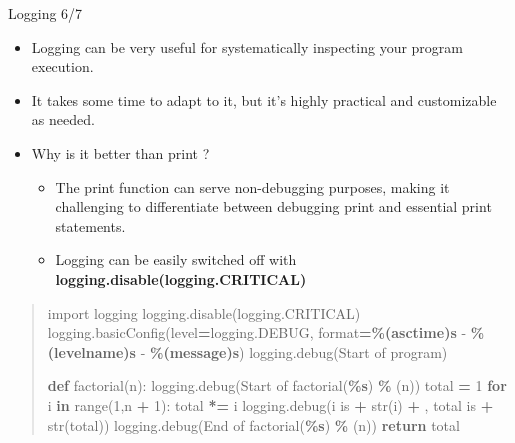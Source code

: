 \documentclass[
  8pt,
  ignorenonframetext,
]{beamer}
\newenvironment{Shaded}{\begin{snugshade}}{\end{snugshade}}
\newcommand{\BuiltInTok}[1]{#1}
\newcommand{\ControlFlowTok}[1]{\textcolor[rgb]{0.13,0.29,0.53}{\textbf{#1}}}
\newcommand{\DecValTok}[1]{\textcolor[rgb]{0.00,0.00,0.81}{#1}}
\newcommand{\ImportTok}[1]{#1}
\newcommand{\KeywordTok}[1]{\textcolor[rgb]{0.13,0.29,0.53}{\textbf{#1}}}
\newcommand{\NormalTok}[1]{#1}
\newcommand{\OperatorTok}[1]{\textcolor[rgb]{0.81,0.36,0.00}{\textbf{#1}}}
\newcommand{\SpecialCharTok}[1]{\textcolor[rgb]{0.81,0.36,0.00}{\textbf{#1}}}
\newcommand{\StringTok}[1]{\textcolor[rgb]{0.31,0.60,0.02}{#1}}
\providecommand{\tightlist}{%
  \setlength{\itemsep}{0pt}\setlength{\parskip}{0pt}}
\begin{document}
\begin{frame}[fragile]{Logging 6/7}
\protect\hypertarget{logging-67}{}
\begin{itemize}[<+->]
\tightlist
\item
  Logging can be very useful for systematically inspecting your program
  execution.
\end{itemize}

\begin{itemize}[<+->]
\tightlist
\item
  It takes some time to adapt to it, but it's highly practical and
  customizable as needed.
\end{itemize}

\begin{itemize}[<+->]
\tightlist
\item
  Why is it better than print ?

  \begin{itemize}[<+->]
  \tightlist
  \item
    The print function can serve non-debugging purposes, making it
    challenging to differentiate between debugging print and essential
    print statements.
  \item
    Logging can be easily switched off with
    \textbf{logging.disable(logging.CRITICAL)}
  \end{itemize}
\end{itemize}

\begin{quote}
\begin{Shaded}
\begin{Highlighting}[]
\ImportTok{import}\NormalTok{ logging}
\NormalTok{logging.disable(logging.CRITICAL)}
\NormalTok{logging.basicConfig(level}\OperatorTok{=}\NormalTok{logging.DEBUG, }\BuiltInTok{format}\OperatorTok{=}\StringTok{\textquotesingle{}}\SpecialCharTok{\%(asctime)s}\StringTok{ {-} }\SpecialCharTok{\%(levelname)s}\StringTok{ {-} }\SpecialCharTok{\%(message)s}\StringTok{\textquotesingle{}}\NormalTok{)}
\NormalTok{logging.debug(}\StringTok{\textquotesingle{}Start of program\textquotesingle{}}\NormalTok{)}

\KeywordTok{def}\NormalTok{ factorial(n):}
\NormalTok{    logging.debug(}\StringTok{\textquotesingle{}Start of factorial(}\SpecialCharTok{\%s}\StringTok{)\textquotesingle{}}  \OperatorTok{\%}\NormalTok{ (n))}
\NormalTok{    total }\OperatorTok{=} \DecValTok{1}
    \ControlFlowTok{for}\NormalTok{ i }\KeywordTok{in} \BuiltInTok{range}\NormalTok{(}\DecValTok{1}\NormalTok{,n }\OperatorTok{+} \DecValTok{1}\NormalTok{):}
\NormalTok{        total }\OperatorTok{*=}\NormalTok{ i}
\NormalTok{        logging.debug(}\StringTok{\textquotesingle{}i is \textquotesingle{}} \OperatorTok{+} \BuiltInTok{str}\NormalTok{(i) }\OperatorTok{+} \StringTok{\textquotesingle{}, total is \textquotesingle{}} \OperatorTok{+} \BuiltInTok{str}\NormalTok{(total))}
\NormalTok{    logging.debug(}\StringTok{\textquotesingle{}End of factorial(}\SpecialCharTok{\%s}\StringTok{)\textquotesingle{}}  \OperatorTok{\%}\NormalTok{ (n))}
    \ControlFlowTok{return}\NormalTok{ total}


\end{Highlighting}
\end{Shaded}
\end{quote}
\end{frame}
\end{document}
